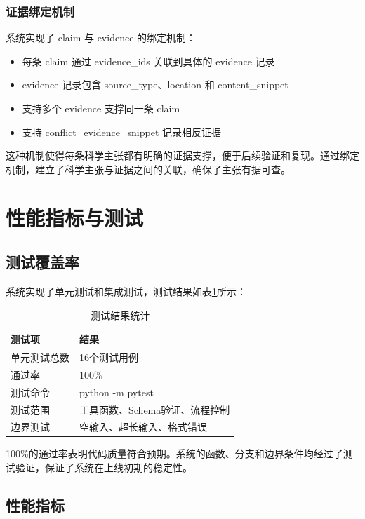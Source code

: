 ﻿\documentclass[a4paper,12pt]{article}
\begin{document}
\subsubsection{证据绑定机制}

系统实现了 claim 与 evidence 的绑定机制：

\begin{itemize}
    \item 每条 claim 通过 evidence\_ids 关联到具体的 evidence 记录
    \item evidence 记录包含 source\_type、location 和 content\_snippet
    \item 支持多个 evidence 支撑同一条 claim
    \item 支持 conflict\_evidence\_snippet 记录相反证据
\end{itemize}

这种机制使得每条科学主张都有明确的证据支撑，便于后续验证和复现。通过绑定机制，建立了科学主张与证据之间的关联，确保了主张有据可查。

\section{性能指标与测试}

\subsection{测试覆盖率}

系统实现了单元测试和集成测试，测试结果如表\ref{tab:test_results}所示：

\begin{table}[H]
\centering
\caption{测试结果统计}
\label{tab:test_results}
\begin{tabular}{p{4cm}p{6cm}}
\toprule
\textbf{测试项} & \textbf{结果} \\
\midrule
单元测试总数 & 16个测试用例 \\
通过率 & 100\% \\
测试命令 & python -m pytest \\
测试范围 & 工具函数、Schema验证、流程控制 \\
边界测试 & 空输入、超长输入、格式错误 \\
\bottomrule
\end{tabular}
\end{table}

100\%的通过率表明代码质量符合预期。系统的函数、分支和边界条件均经过了测试验证，保证了系统在上线初期的稳定性。

\subsection{性能指标}
\end{document}
